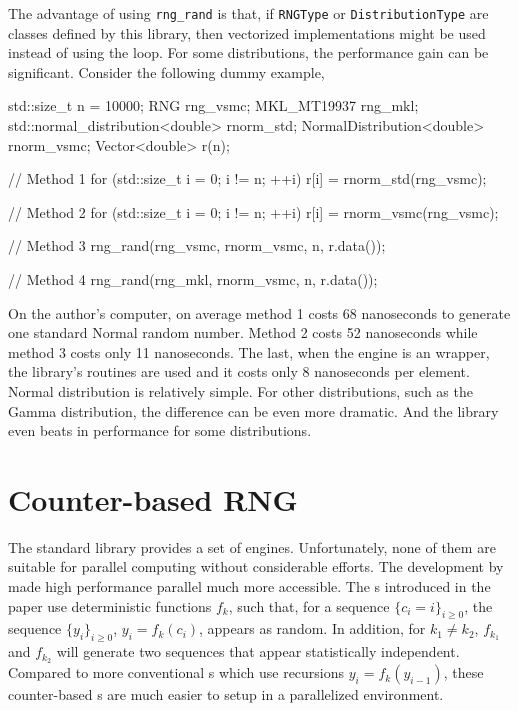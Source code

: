 The advantage of using \verb|rng_rand| is that, if \verb|RNGType| or
\verb|DistributionType| are classes defined by this library, then vectorized
implementations might be used instead of using the loop. For some
distributions, the performance gain can be significant. Consider the following
dummy example,
\begin{cppcode}
  std::size_t n = 10000;
  RNG rng_vsmc;
  MKL_MT19937 rng_mkl;
  std::normal_distribution<double> rnorm_std;
  NormalDistribution<double> rnorm_vsmc;
  Vector<double> r(n);

  // Method 1
  for (std::size_t i = 0; i != n; ++i)
      r[i] = rnorm_std(rng_vsmc);

  // Method 2
  for (std::size_t i = 0; i != n; ++i)
      r[i] = rnorm_vsmc(rng_vsmc);

  // Method 3
  rng_rand(rng_vsmc, rnorm_vsmc, n, r.data());

  // Method 4
  rng_rand(rng_mkl, rnorm_vsmc, n, r.data());
\end{cppcode}
On the author's computer, on average method 1 costs 68 nanoseconds to generate
one standard Normal random number. Method 2 costs 52 nanoseconds while method 3
costs only 11 nanoseconds. The last, when the \rng{} engine is an \mkl{} \rng
wrapper, the \mkl library's routines are used and it costs only 8 nanoseconds
per element. Normal distribution is relatively simple. For other distributions,
such as the Gamma distribution, the difference can be even more dramatic. And
the library even beats \mkl in performance for some distributions.

\section{Counter-based RNG}
\label{sec:Counter-based RNG}

The standard library provides a set of \rng engines. Unfortunately, none of
them are suitable for parallel computing without considerable efforts. The
development by \textcite{Salmon:2011um} made high performance parallel \rng
much more accessible. The \rng{}s introduced in the paper use deterministic
functions $f_k$, such that, for a sequence $\{c_i = i\}_{i\ge0}$, the sequence
$\{y_i\}_{i\ge0}$, $y_i = f_k(c_i)$, appears as random. In addition, for $k_1
\ne k_2$, $f_{k_1}$ and $f_{k_2}$ will generate two sequences that appear
statistically independent. Compared to more conventional \rng{}s which use
recursions $y_i = f_k(y_{i - 1})$, these counter-based \rng{}s are much easier
to setup in a parallelized environment.

